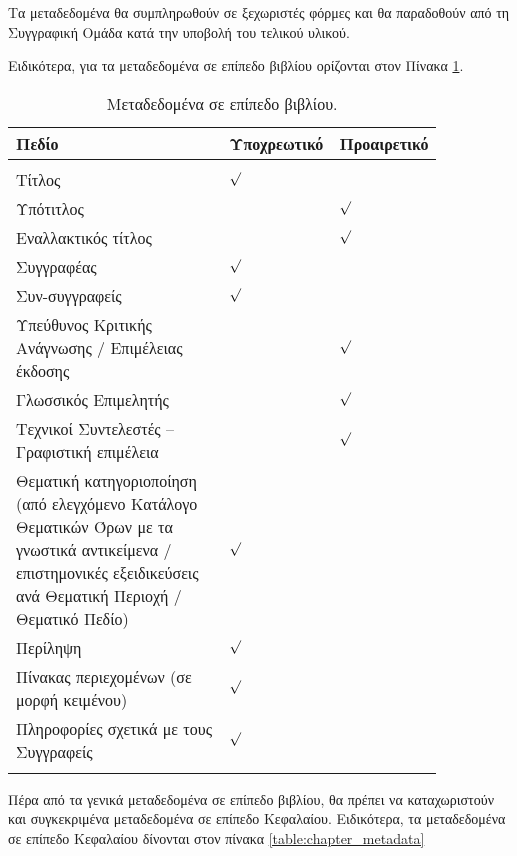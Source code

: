 Τα  μεταδεδομένα  θα  συμπληρωθούν  σε  ξεχωριστές  φόρμες  και  θα  παραδοθούν  από  τη
Συγγραφική Ομάδα κατά την υποβολή του τελικού υλικού.

Ειδικότερα, για τα μεταδεδομένα σε επίπεδο βιβλίου ορίζονται στον Πίνακα \ref{table:book_metadata}.

\begin{table} [ht] \centering
\caption{Μεταδεδομένα σε επίπεδο βιβλίου.}
\vspace{2mm}
\begin{tabular} {p{0.55\linewidth} p{0.15\linewidth} p{0.15\linewidth}}
\hline
	\textbf{Πεδίο}	&\textbf{Υποχρεωτικό}	&\textbf{Προαιρετικό}\tabularnewline
\hline
		&	    &	\tabularnewline
Τίτλος		& \centering $\surd$	    &\tabularnewline
Υπότιτλος	&	    	&\centering $\surd$	\tabularnewline
Εναλλακτικός τίτλος &  & \centering $\surd$	\tabularnewline
Συγγραφέας	&\centering $\surd$	    &	\tabularnewline
Συν-συγγραφείς	&\centering $\surd$	    &	\tabularnewline
Υπεύθυνος Κριτικής Ανάγνωσης / Επιμέλειας έκδοσης	&	    &\centering $\surd$	\tabularnewline
Γλωσσικός Επιμελητής	&	    &\centering $\surd$	\tabularnewline
Τεχνικοί Συντελεστές – Γραφιστική επιμέλεια	&	    &\centering $\surd$	\tabularnewline
Θεματική κατηγοριοποίηση (από ελεγχόμενο Κατάλογο
Θεματικών Όρων με τα γνωστικά αντικείμενα / επιστημονικές
εξειδικεύσεις ανά Θεματική Περιοχή / Θεματικό Πεδίο)	&\centering $\surd$	    &	\tabularnewline
Περίληψη	&\centering $\surd$	    &	\tabularnewline
Πίνακας περιεχομένων (σε μορφή κειμένου)	&\centering $\surd$	    &	\tabularnewline
Πληροφορίες σχετικά με τους Συγγραφείς	&\centering $\surd$	    &	\tabularnewline
	&	    &	\tabularnewline
\hline
\end{tabular}
\label{table:book_metadata}
\end{table}


Πέρα από τα γενικά μεταδεδομένα σε επίπεδο βιβλίου, θα πρέπει να καταχωριστούν και
συγκεκριμένα μεταδεδομένα σε επίπεδο Κεφαλαίου. Ειδικότερα, τα μεταδεδομένα σε επίπεδο Κεφαλαίου δίνονται στον πίνακα \ref{table:chapter_metadata}

